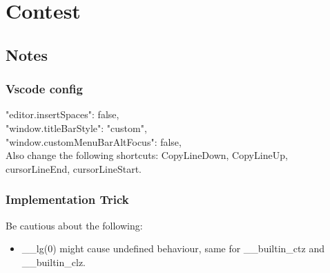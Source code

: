 \chapter{Contest}


\section{Notes}
\subsection{Vscode config}
\quad "editor.insertSpaces": false,\\
\quad "window.titleBarStyle": "custom",\\
\quad "window.customMenuBarAltFocus": false,\\
Also change the following shortcuts: CopyLineDown, CopyLineUp, cursorLineEnd, cursorLineStart.
    
    

\subsection{Implementation Trick}
Be cautious about the following:
\begin{itemize}
	\item \_\_lg(0) might cause undefined behaviour, same for \_\_builtin\_ctz and \_\_builtin\_clz.
\end{itemize}
